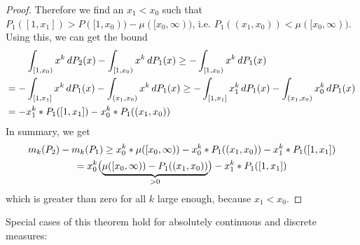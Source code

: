 \documentclass[a4paper]{scrreprt}
\begin{document}
\begin{proof}
        Therefore we find an $x_1 < x_0$ such that $P_1([1, x_1]) > P([1, x_0)) - \mu([x_0, \infty))$, i.e. $P_1((x_1, x_0)) < \mu([x_0, \infty))$.
        Using this, we can get the bound
        \begin{align*}
            &\lintegral{[1, x_0)}{x^k}{P_2(x)} - \lintegral{[1, x_0)}{x^k}{P_1(x)}
            \geq - \lintegral{[1, x_0)}{x^k}{P_1(x)} \\
            = - &\lintegral{[1, x_1]}{x^k}{P_1(x)} - \lintegral{(x_1, x_0)}{x^k}{P_1(x)}
            \geq - \lintegral{[1, x_1]}{x_1^k}{P_1(x)} - \lintegral{(x_1, x_0)}{x_0^k}{P_1(x)} \\
            =   -  & x_1^k * P_1([1, x_1]) - x_0^k * P_1((x_1, x_0))
        \end{align*}
        In summary, we get
        \begin{multline*}
            m_k(P_2) - m_k(P_1)
            \geq x_0^k * \mu([x_0, \infty)) - x_0^k * P_1((x_1, x_0)) - x_1^k * P_1([1, x_1]) \\
            = x_0^k \bigpars{\undersetbrace{\mu([x_0, \infty)) - P_1((x_1, x_0))}{> 0}} - x_1^k * P_1([1, x_1])
        \end{multline*}
        which is greater than zero for all $k$ large enough, because $x_1 < x_0$.
    \end{proof}
    
    Special cases of this theorem hold for absolutely continuous and discrete measures:
    
\end{document}

